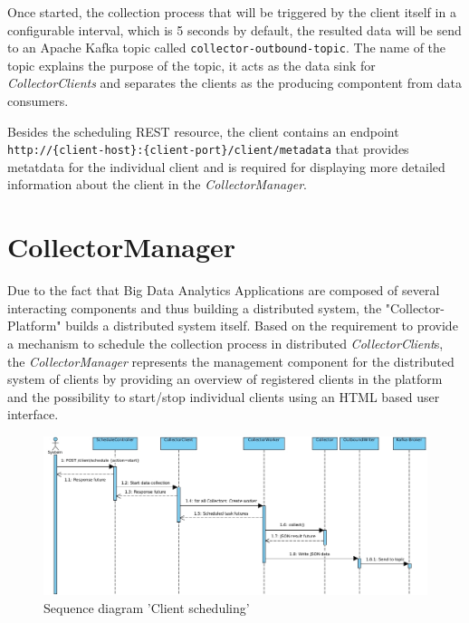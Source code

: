 Once started, the collection process that will be triggered by the client itself in a configurable interval, which is 5 seconds by default,
the resulted data will be send to an Apache Kafka topic called \verb|collector-outbound-topic|. The name of the topic explains the
purpose of the topic, it acts as the data sink for \textit{CollectorClients} and separates the clients as the producing compontent
from data consumers.

Besides the scheduling REST resource, the client contains an endpoint \newline \verb|http://{client-host}:{client-port}/client/metadata|
that provides metatdata for the individual client and is required
for displaying more detailed information about the client in the \textit{CollectorManager}.


%

\section{CollectorManager}
\label{sec:arch-collector-manager}
Due to the fact that Big Data Analytics Applications are composed of several interacting components and thus building
a distributed system, the "Collector-Platform" builds a distributed system itself. Based on the requirement to provide a
mechanism to schedule the collection process in distributed \textit{CollectorClient}s, the \textit{CollectorManager} represents the management
component for the distributed system of clients by providing an overview of registered clients in the platform and
the possibility to start/stop individual clients using an HTML based user interface.

\begin{figure}[H]
 	\centering
 	\includegraphics[width=1.0\textwidth]{../uml/sequence-scheduling.jpg}
 	\caption{Sequence diagram 'Client scheduling'}
 	\label{fig:sequence-client-scheduling}
 \end{figure}

